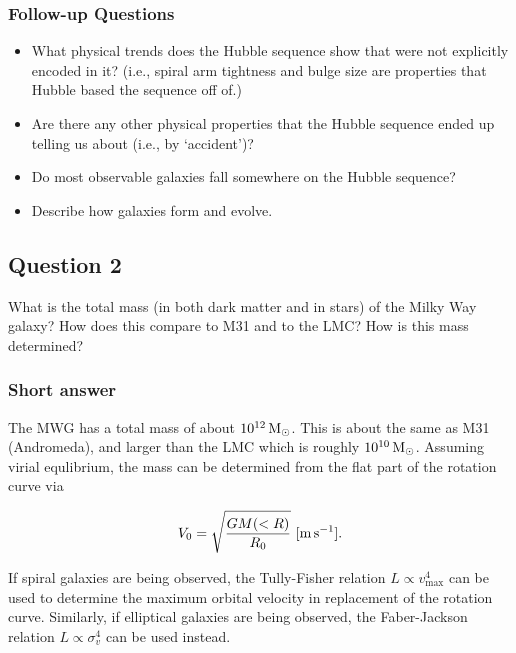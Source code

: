 \documentclass[a4paper,10pt]{article}
\begin{document}
\subsubsection{Follow-up Questions}

\begin{itemize}
    \item What physical trends does the Hubble sequence show that were not explicitly encoded in it? (i.e., spiral arm tightness and bulge size are properties that Hubble based the sequence off of.)
    \item Are there any other physical properties that the Hubble sequence ended up telling us about (i.e., by `accident')?
    \item Do most observable galaxies fall somewhere on the Hubble sequence?
    \item Describe how galaxies form and evolve.
\end{itemize}



\newpage
\subsection{Question 2}

What is the total mass (in both dark matter and in stars) of the Milky Way galaxy? How does this compare to M31 and to the LMC? How is this mass determined?

\subsubsection{Short answer}

The MWG has a total mass of about $10^{12}\,{\rm M_\odot}$. This is about the same as M31 (Andromeda), and larger than the LMC which is roughly $10^{10}\,{\rm M_\odot}$. Assuming virial equlibrium, the mass can be determined from the flat part of the rotation curve via

\begin{align*}
    V_0 = \sqrt{\frac{GM(<R)}{R_0}} ~ [{\rm m\,s^{-1}}].
\end{align*}

{\noindent}If spiral galaxies are being observed, the Tully-Fisher relation $L\propto v_\mathrm{max}^4$ can be used to determine the maximum orbital velocity in replacement of the rotation curve. Similarly, if elliptical galaxies are being observed, the Faber-Jackson relation $L\propto\sigma_v^4$ can be used instead.
\end{document}
